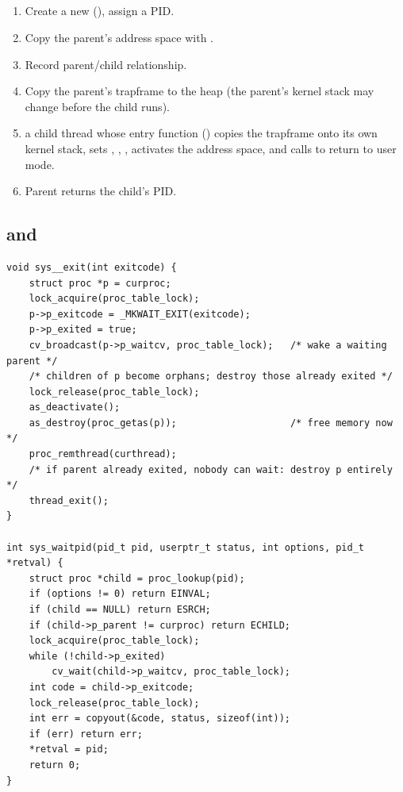 \subsection*{}
\begin{enumerate}
  \item Create a new  (), assign a PID.
  \item Copy the parent's address space with .
  \item Record parent/child relationship.
  \item Copy the parent's trapframe to the heap (the parent's kernel stack may change before
    the child runs).
  \item {} a child thread whose entry function ()
    copies the trapframe onto its own kernel stack, sets , ,
    , activates the address space, and calls  to return to
    user mode.
  \item Parent returns the child's PID.
\end{enumerate}

\subsection*{ and }
\begin{lstlisting}[style=c]
void sys__exit(int exitcode) {
    struct proc *p = curproc;
    lock_acquire(proc_table_lock);
    p->p_exitcode = _MKWAIT_EXIT(exitcode);
    p->p_exited = true;
    cv_broadcast(p->p_waitcv, proc_table_lock);   /* wake a waiting parent */
    /* children of p become orphans; destroy those already exited */
    lock_release(proc_table_lock);
    as_deactivate();
    as_destroy(proc_getas(p));                    /* free memory now */
    proc_remthread(curthread);
    /* if parent already exited, nobody can wait: destroy p entirely */
    thread_exit();
}

int sys_waitpid(pid_t pid, userptr_t status, int options, pid_t *retval) {
    struct proc *child = proc_lookup(pid);
    if (options != 0) return EINVAL;
    if (child == NULL) return ESRCH;
    if (child->p_parent != curproc) return ECHILD;
    lock_acquire(proc_table_lock);
    while (!child->p_exited)
        cv_wait(child->p_waitcv, proc_table_lock);
    int code = child->p_exitcode;
    lock_release(proc_table_lock);
    int err = copyout(&code, status, sizeof(int));
    if (err) return err;
    *retval = pid;
    return 0;
}
\end{lstlisting}

